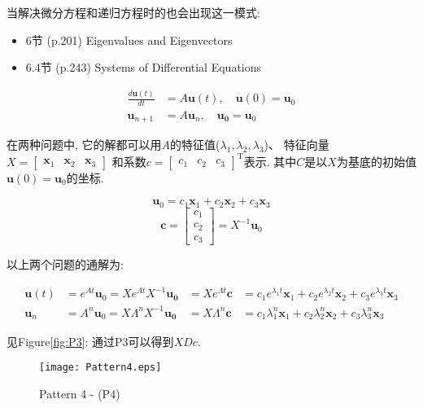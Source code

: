 \documentclass[letterpaper]{article}
\DeclareRobustCommand\transp{^{\mathrm{T}}}
\begin{document}
当解决微分方程和递归方程时的也会出现这一模式: 

\begin{itemize}
  \item 6节 (p.201) Eigenvalues and Eigenvectors
  \item 6.4节 (p.243) Systems of Differential Equations
\end{itemize} 

\begin{align*}
  \frac{d \bm{u}(t) }{dt} &= A \bm{u}(t), \quad \bm{u}(0)=\bm{u}_0\\
  \bm{u}_{n+1} &= A \bm{u}_n, \quad \bm{u_0} = \bm{u}_0
\end{align*}

在两种问题中, 它的解都可以用$A$的特征值($\lambda_1, \lambda_2, \lambda_3$)、
特征向量$X=\begin{bmatrix} \bm{x}_1 & \bm{x}_2 & \bm{x}_3 \end{bmatrix}$
和系数$c=\begin{bmatrix} c_1 & c_2 & c_3 \end{bmatrix}\transp$表示. 
其中$C$是以$X$为基底的初始值$\bm{u}(0)=\bm{u}_0$的坐标.

\begin{equation*}
  \bm{u}_0 = c_1 \bm{x}_1 + c_2 \bm{x}_2 + c_3 \bm{x}_3
\end{equation*}
\begin{equation*}
  \bm{c} =
  \begin{bmatrix}
    c_1\\
    c_2\\
    c_3
  \end{bmatrix} = X^{-1} \bm{u}_0
\end{equation*}

以上两个问题的通解为: 

\begin{align*}
  \bm{u}(t) &= e^{At} \bm{u}_0 = X e^{\Lambda t} X^{-1} \bm{u_0} &= X e^{\Lambda t} \bm{c} &= c_1 e^{\lambda_1 t} \bm{x}_1 + c_2 e^{\lambda_2 t} \bm{x}_2 + c_3 e^{\lambda_3 t} \bm{x}_3\\
  \bm{u}_n &= A^n \bm{u}_0 = X \Lambda^n X^{-1} \bm{u_0} &= X \Lambda^n \bm{c} &= c_1 \lambda_1^n \bm{x}_1 + c_2 \lambda_2^n \bm{x}_2 + c_3 \lambda_3^n \bm{x}_3
\end{align*}

见Figure\ref{fig:P3}: 通过P3可以得到$XDc$. 

\begin{figure}[H]
  \centering
  \texttt{[image: Pattern4.eps]}
  \caption{Pattern 4 - (P4)}
\end{figure}
\end{document}
